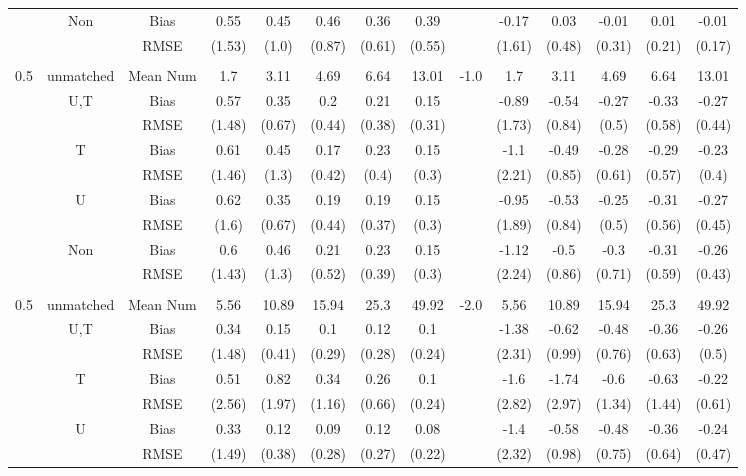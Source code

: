 \begin{tabular}{@{\extracolsep{5pt}}lc|cccccc|lccccc}
 & Non & Bias & 0.55 & 0.45 & 0.46 & 0.36 & 0.39 &  & -0.17 & 0.03 & -0.01 & 0.01 & -0.01 \\
 &  & RMSE & (1.53) & (1.0) & (0.87) & (0.61) & (0.55) &  & (1.61) & (0.48) & (0.31) & (0.21) & (0.17) \\
 &  &  &  &  &  &  &  &  &  &  &  &  &  \\
0.5 & unmatched & Mean Num & 1.7 & 3.11 & 4.69 & 6.64 & 13.01 & -1.0 & 1.7 & 3.11 & 4.69 & 6.64 & 13.01 \\
 & U,T & Bias & 0.57 & 0.35 & 0.2 & 0.21 & 0.15 &  & -0.89 & -0.54 & -0.27 & -0.33 & -0.27 \\
 &  & RMSE & (1.48) & (0.67) & (0.44) & (0.38) & (0.31) &  & (1.73) & (0.84) & (0.5) & (0.58) & (0.44) \\
 & T & Bias & 0.61 & 0.45 & 0.17 & 0.23 & 0.15 &  & -1.1 & -0.49 & -0.28 & -0.29 & -0.23 \\
 &  & RMSE & (1.46) & (1.3) & (0.42) & (0.4) & (0.3) &  & (2.21) & (0.85) & (0.61) & (0.57) & (0.4) \\
 & U & Bias & 0.62 & 0.35 & 0.19 & 0.19 & 0.15 &  & -0.95 & -0.53 & -0.25 & -0.31 & -0.27 \\
 &  & RMSE & (1.6) & (0.67) & (0.44) & (0.37) & (0.3) &  & (1.89) & (0.84) & (0.5) & (0.56) & (0.45) \\
 & Non & Bias & 0.6 & 0.46 & 0.21 & 0.23 & 0.15 &  & -1.12 & -0.5 & -0.3 & -0.31 & -0.26 \\
 &  & RMSE & (1.43) & (1.3) & (0.52) & (0.39) & (0.3) &  & (2.24) & (0.86) & (0.71) & (0.59) & (0.43) \\
 &  &  &  &  &  &  &  &  &  &  &  &  &  \\
0.5 & unmatched & Mean Num & 5.56 & 10.89 & 15.94 & 25.3 & 49.92 & -2.0 & 5.56 & 10.89 & 15.94 & 25.3 & 49.92 \\
 & U,T & Bias & 0.34 & 0.15 & 0.1 & 0.12 & 0.1 &  & -1.38 & -0.62 & -0.48 & -0.36 & -0.26 \\
 &  & RMSE & (1.48) & (0.41) & (0.29) & (0.28) & (0.24) &  & (2.31) & (0.99) & (0.76) & (0.63) & (0.5) \\
 & T & Bias & 0.51 & 0.82 & 0.34 & 0.26 & 0.1 &  & -1.6 & -1.74 & -0.6 & -0.63 & -0.22 \\
 &  & RMSE & (2.56) & (1.97) & (1.16) & (0.66) & (0.24) &  & (2.82) & (2.97) & (1.34) & (1.44) & (0.61) \\
 & U & Bias & 0.33 & 0.12 & 0.09 & 0.12 & 0.08 &  & -1.4 & -0.58 & -0.48 & -0.36 & -0.24 \\
 &  & RMSE & (1.49) & (0.38) & (0.28) & (0.27) & (0.22) &  & (2.32) & (0.98) & (0.75) & (0.64) & (0.47) \\

\end{tabular}
